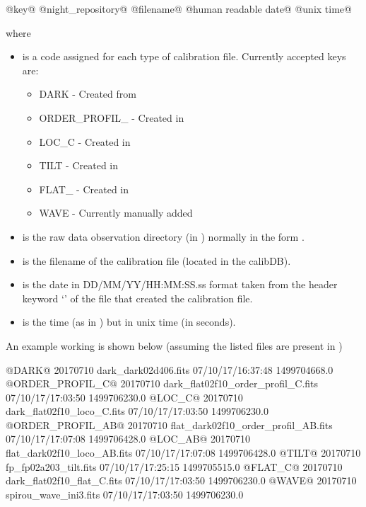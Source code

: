 \begin{textbox}
@{key}@ @{night_repository}@ @{filename}@ @{human readable date}@ @{unix time}@ 
\end{textbox}
\begin{thighlight}
\noindent where
\begin{itemize}
\item {} is a code assigned for each type of calibration file. Currently accepted keys are:
\begin{itemize}
\item DARK - Created from \calDARK
\item ORDER\_PROFIL\_ - Created in \callocRAW
\item LOC\_C - Created in \callocRAW
\item TILT - Created in \calSLIT
\item FLAT\_ - Created in \calFFraw
\item WAVE - Currently manually added
\end{itemize}

\item {} is the raw data observation directory (in ) normally in the form \constantFolderDateFormat.

\item {} is the filename of the calibration file (located in the calibDB).

\item {} is the date in DD/MM/YY/HH:MM:SS.ss format taken from the header keyword `\constantAcqtimeKey' of the file that created the calibration file.

\item {} is the time (as in ) but in unix time (in seconds).

\end{itemize}
\end{thighlight}

\noindent An example working \masterCALIBDBfile is shown below (assuming the listed files are present in )
\begin{textbox}
@DARK@ 20170710 dark_dark02d406.fits 07/10/17/16:37:48 1499704668.0
@ORDER_PROFIL_C@ 20170710 dark_flat02f10_order_profil_C.fits 07/10/17/17:03:50 1499706230.0
@LOC_C@ 20170710 dark_flat02f10_loco_C.fits 07/10/17/17:03:50 1499706230.0
@ORDER_PROFIL_AB@ 20170710 flat_dark02f10_order_profil_AB.fits 07/10/17/17:07:08 1499706428.0
@LOC_AB@ 20170710 flat_dark02f10_loco_AB.fits 07/10/17/17:07:08 1499706428.0
@TILT@ 20170710 fp_fp02a203_tilt.fits 07/10/17/17:25:15 1499705515.0
@FLAT_C@ 20170710 dark_flat02f10_flat_C.fits 07/10/17/17:03:50 1499706230.0
@WAVE@ 20170710 spirou_wave_ini3.fits 07/10/17/17:03:50 1499706230.0
\end{textbox}
